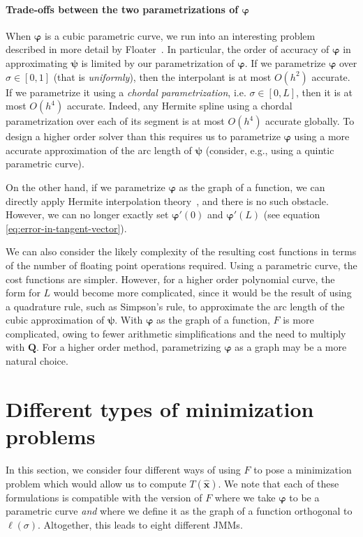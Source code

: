 \documentclass{siamart190516}
\renewcommand{\phi}{\varphi}
\newcommand{\m}[1]{\boldsymbol{#1}}
\newcommand{\xhat}{\hat{\m{x}}}
\newcommand{\mphi}{\m{\phi}}
\newcommand{\mpsi}{\m{\psi}}
\newcommand{\mell}{\m{\ell}}
\begin{document}
\paragraph{Trade-offs between the two parametrizations of $\mphi$}
When $\mphi$ is a cubic parametric curve, we run into an interesting
problem described in more detail by Floater~\cite{Floater:2006aa}. In
particular, the order of accuracy of $\mphi$ in approximating $\mpsi$
is limited by our parametrization of $\mphi$. If we parametrize
$\mphi$ over $\sigma \in [0, 1]$ (that is \emph{uniformly}), then the
interpolant is at most $O(h^2)$ accurate. If we parametrize it using a
\emph{chordal parametrization}, i.e. $\sigma \in [0, L]$, then it is
at most $O(h^4)$ accurate. Indeed, any Hermite spline using a chordal
parametrization over each of its segment is at most $O(h^4)$ accurate
globally. To design a higher order solver than this requires us to
parametrize $\mphi$ using a more accurate approximation of the arc
length of $\mpsi$ (consider, e.g., using a quintic parametric curve).

On the other hand, if we parametrize $\mphi$ as the graph of a
function, we can directly apply Hermite interpolation
theory~\cite{Stoer:2013aa}, and there is no such obstacle. However, we
can no longer exactly set $\mphi'(0)$ and $\mphi'(L)$ (see equation
\eqref{eq:error-in-tangent-vector}).

We can also consider the likely complexity of the resulting cost
functions in terms of the number of floating point operations
required. Using a parametric curve, the cost functions are
simpler. However, for a higher order polynomial curve, the form for
$L$ would become more complicated, since it would be the result of
using a quadrature rule, such as Simpson's rule, to approximate the
arc length of the cubic approximation of $\mpsi$. With $\mphi$ as the
graph of a function, $F$ is more complicated, owing to fewer
arithmetic simplifications and the need to multiply with $\m{Q}$. For
a higher order method, parametrizing $\mphi$ as a graph may be a more
natural choice.

\section{Different types of minimization problems}

In this section, we consider four different ways of using $F$ to pose
a minimization problem which would allow us to compute $T(\xhat)$. We
note that each of these formulations is compatible with the version of
$F$ where we take $\mphi$ to be a parametric curve \emph{and} where we
define it as the graph of a function orthogonal to
$\mell(\sigma)$. Altogether, this leads to eight different JMMs.
\end{document}

